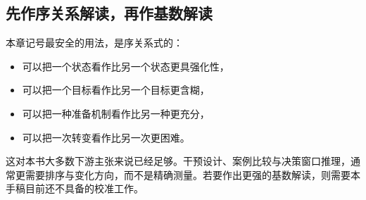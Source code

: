 \subsection{先作序关系解读，再作基数解读}

本章记号最安全的用法，是序关系式的：
\begin{itemize}[nosep]
  \item 可以把一个状态看作比另一个状态更具强化性，
  \item 可以把一个目标看作比另一个目标更含糊，
  \item 可以把一种准备机制看作比另一种更充分，
  \item 可以把一次转变看作比另一次更困难。
\end{itemize}

这对本书大多数下游主张来说已经足够。干预设计、案例比较与决策窗口推理，通常更需要排序与变化方向，而不是精确测量。若要作出更强的基数解读，则需要本手稿目前还不具备的校准工作。